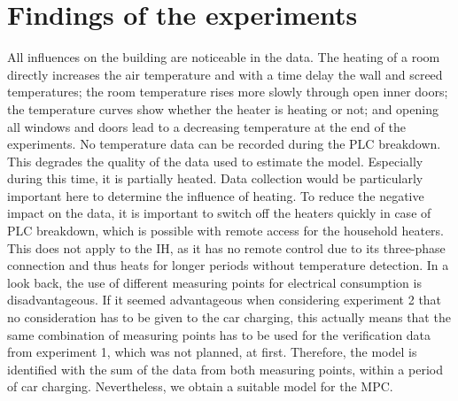 \section{Findings of the experiments}
\label{sec:findings of the experiments}
All influences on the building are noticeable in the data. The heating of a room directly increases the air temperature and with a time delay the wall and screed temperatures; the room temperature rises more slowly through open inner doors; the temperature curves show whether the heater is heating or not; and opening all windows and doors lead to a decreasing temperature at the end of the experiments. \newline
No temperature data can be recorded during the PLC breakdown. This degrades the quality of the data used to estimate the model. Especially during this time, it is partially heated. Data collection would be particularly important here to determine the influence of heating. To reduce the negative impact on the data, it is important to switch off the heaters quickly in case of PLC breakdown, which is possible with remote access for the household heaters. This does not apply to the IH, as it has no remote control due to its three-phase connection and thus heats for longer periods without temperature detection.\newline
In a look back, the use of different measuring points for electrical consumption is disadvantageous. If it seemed advantageous when considering experiment 2 that no consideration has to be given to the car charging, this actually means that the same combination of measuring points has to be used for the verification data from experiment 1, which was not planned, at first. Therefore, the model is identified with the sum of the data from both measuring points, within a period of car charging. Nevertheless, we obtain a suitable model for the MPC.

